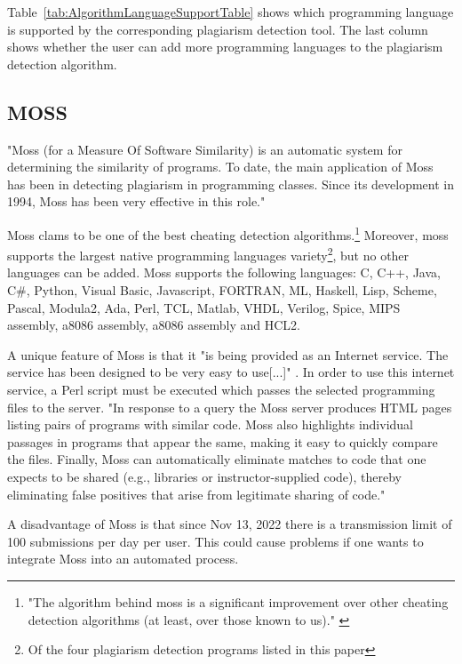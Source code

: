 \documentclass[a4paper, 11pt]{article}
\renewcommand{\\}{\vspace*{0.5\baselineskip} \newline}
\begin{document}
Table~\ref{tab:AlgorithmLanguageSupportTable} shows which programming language is supported by the corresponding plagiarism detection tool. The last column shows whether the user can add more programming languages to the plagiarism detection algorithm.

\clearpage

\subsection{MOSS}

"Moss (for a Measure Of Software Similarity) is an automatic system for determining the similarity of programs. To date, the main application of Moss has been in detecting plagiarism in programming classes. Since its development in 1994, Moss has been very effective in this role." \autocite{SMOSS}

Moss clams to be one of the best cheating detection algorithms.\footnote{"The algorithm behind moss is a significant improvement over other cheating detection algorithms (at least, over those known to us)." \autocite{SMOSS}} Moreover, moss supports the largest native programming languages variety\footnote{Of the four plagiarism detection programs listed in this paper}, but no other languages can be added. Moss supports the following languages: C, C++, Java, C\#, Python, Visual Basic, Javascript, FORTRAN, ML, Haskell, Lisp, Scheme, Pascal, Modula2, Ada, Perl, TCL, Matlab, VHDL, Verilog, Spice, MIPS assembly, a8086 assembly, a8086 assembly and HCL2.

A unique feature of Moss is that it "is being provided as an Internet service. The service has been designed to be very easy to use[...]" \autocite{SMOSS}. In order to use this internet service, a Perl script must be executed which passes the selected programming files to the server. "In response to a query the Moss server produces HTML pages listing pairs of programs with similar code. Moss also highlights individual passages in programs that appear the same, making it easy to quickly compare the files. Finally, Moss can automatically eliminate matches to code that one expects to be shared (e.g., libraries or instructor-supplied code), thereby eliminating false positives that arise from legitimate sharing of code." \autocite{SMOSS}

A disadvantage of Moss is that since Nov 13, 2022 there is a transmission limit of 100 submissions per day per user. This could cause problems if one wants to integrate Moss into an automated process.
\end{document}
